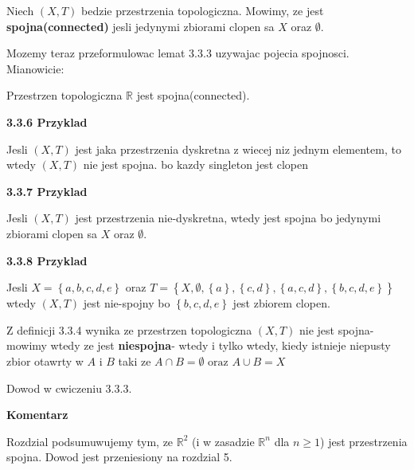 \documentclass{article}
\begin{document}
\begin{tcolorbox}[colback=white!90!red,colframe=black!35!red,title=3.3.4 Definicja:Spojnosc(connected)]

    Niech $(X,T)$ bedzie przestrzenia topologiczna. Mowimy, ze jest \textbf{spojna(connected)} jesli jedynymi zbiorami clopen sa $X$ oraz $\emptyset$.

\end{tcolorbox}

Mozemy teraz przeformulowac lemat 3.3.3 uzywajac pojecia spojnosci. Mianowicie:

\begin{tcolorbox}[colback=white!90!green,colframe=black!35!green,title=3.3.5 Lemat: Spojnosc $\mathbb{R}$]

    Przestrzen topologiczna $\mathbb{R}$ jest spojna(connected).

\end{tcolorbox}

\textbf{3.3.6 Przyklad}

Jesli $(X,T)$ jest jaka przestrzenia dyskretna z wiecej niz jednym elementem, to wtedy  $(X,T)$ nie jest spojna. bo kazdy singleton jest clopen


\textbf{3.3.7 Przyklad}

Jesli $(X,T)$ jest przestrzenia nie-dyskretna, wtedy jest spojna bo jedynymi zbiorami clopen sa $X$ oraz $\emptyset$.

\textbf{3.3.8 Przyklad}

Jesli $X = \left\{ a, b, c, d, e \right\}$ oraz $T = \left\{ X, \emptyset, \left\{ a \right\}, \left\{ c, d \right\}, \left\{ a,c,d \right\}, \left\{ b,c,d,e \right\}    \right\}$ wtedy $(X,T)$ jest nie-spojny bo $ \left\{ b, c, d, e \right\}$ jest zbiorem clopen.

\begin{tcolorbox}[colback=white!90!red,colframe=black!35!red,title=3.3.9 Definicja: Zbior niespojny]

    Z definicji 3.3.4 wynika ze przestrzen topologiczna $(X,T)$ nie jest spojna- mowimy wtedy ze jest \textbf{niespojna}- wtedy i tylko wtedy, kiedy istnieje niepusty zbior otawrty w $A$ i $B$ taki ze $A\cap B = \emptyset \text{ oraz } A\cup B = X$
 
 Dowod w cwiczeniu 3.3.3.
\end{tcolorbox}

\textbf{Komentarz}

Rozdzial podsumuwujemy tym, ze $\mathbb{R}^{2}$ (i w zasadzie $\mathbb{R}^{n}$ dla $n \geq 1$) jest przestrzenia spojna. Dowod jest przeniesiony na rozdzial 5.
\end{document}
